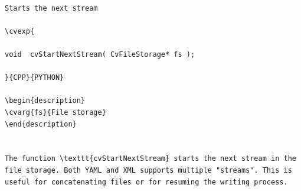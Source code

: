 \label{StartNextStream}
\begin{verbatim}

Starts the next stream

\cvexp{

void  cvStartNextStream( CvFileStorage* fs );

}{CPP}{PYTHON}

\begin{description}
\cvarg{fs}{File storage}
\end{description}


The function \texttt{cvStartNextStream} starts the next stream in the file storage. Both YAML and XML supports multiple "streams". This is useful for concatenating files or for resuming the writing process.


\end{verbatim}
\label{Write}
